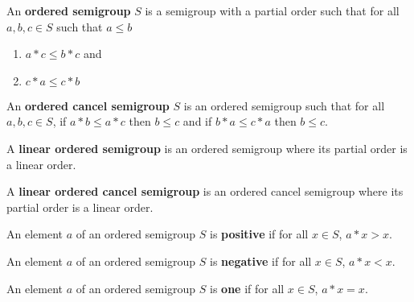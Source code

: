 \begin{definition}\label{def:OrderedSemigroup}\leanok
An \textbf{ordered semigroup} $S$ is a semigroup with a partial order such that
for all $a,b,c\in S$ such that $a \le b$
\begin{enumerate}
    \item $a * c \le b * c$ and
    \item $c * a \le c * b$
\end{enumerate}
\end{definition}

\begin{definition}\label{def:OrderedCancelSemigroup}\leanok
{}
An \textbf{ordered cancel semigroup} $S$ is an ordered semigroup such that for all $a,b,c\in S$,
if $a * b \le a * c$ then $b \le c$ and if $b * a \le c * a$ then $b \le c$.
\end{definition}

\begin{definition}\label{def:LinearOrderedSemigroup}\leanok
{}
A \textbf{linear ordered semigroup} is an ordered semigroup where its partial order is a linear order.
\end{definition}

\begin{definition}\label{def:LinearOrderedCancelSemigroup}\leanok
{}
A \textbf{linear ordered cancel semigroup} is an ordered cancel semigroup where its partial order is a linear order.
\end{definition}

\begin{definition}\label{def:positive}\leanok
{}
An element $a$ of an ordered semigroup $S$ is \textbf{positive} if for all $x\in S$, $a*x > x$.
\end{definition}

\begin{definition}\label{def:negative}\leanok
{}
An element $a$ of an ordered semigroup $S$
is \textbf{negative} if for all $x\in S$, $a*x < x$.
\end{definition}

\begin{definition}\label{def:one}\leanok
{}
An element $a$ of an ordered semigroup $S$
is \textbf{one} if for all $x\in S$, $a*x = x$.
\end{definition}

